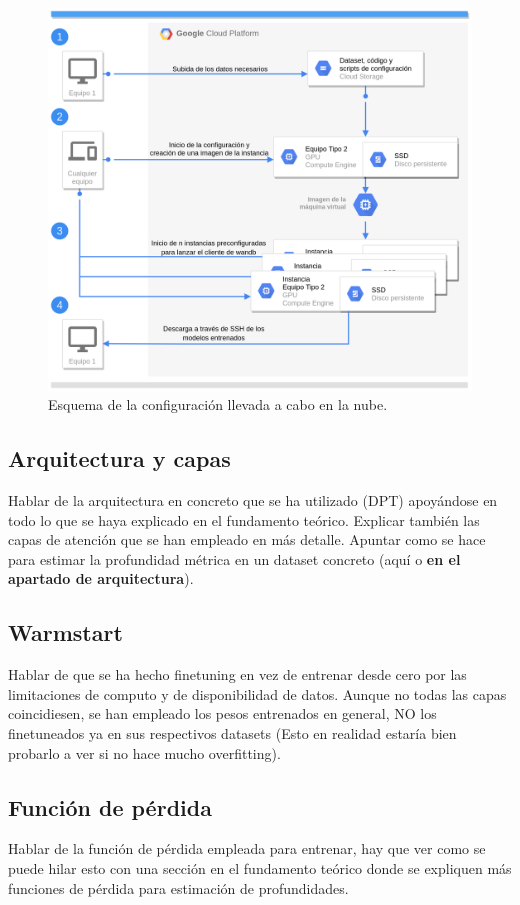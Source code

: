 \begin{figure}[H]
\centering
\includegraphics[width=\textwidth]{imagenes/cloud-diagram.png}
\caption{Esquema de la configuración llevada a cabo en la nube.}
\label{fig:cloud-diagram}
\end{figure}

\subsection{Arquitectura y capas}
Hablar de la arquitectura en concreto que se ha utilizado (DPT) apoyándose en todo lo que se haya explicado en el fundamento teórico. Explicar también las capas de atención que se han empleado en más detalle.
Apuntar como se hace para estimar la profundidad métrica en un dataset concreto (aquí o \textbf{en el apartado de arquitectura}).

\subsection{Warmstart}
Hablar de que se ha hecho finetuning en vez de entrenar desde cero por las limitaciones de computo y de disponibilidad de datos. Aunque no todas las capas coincidiesen, se han empleado los pesos entrenados en general, NO los finetuneados ya en sus respectivos datasets (Esto en realidad estaría bien probarlo a ver si no hace mucho overfitting).

\subsection{Función de pérdida}
Hablar de la función de pérdida empleada para entrenar, hay que ver como se puede hilar esto con una sección en el fundamento teórico donde se expliquen más funciones de pérdida para estimación de profundidades.

